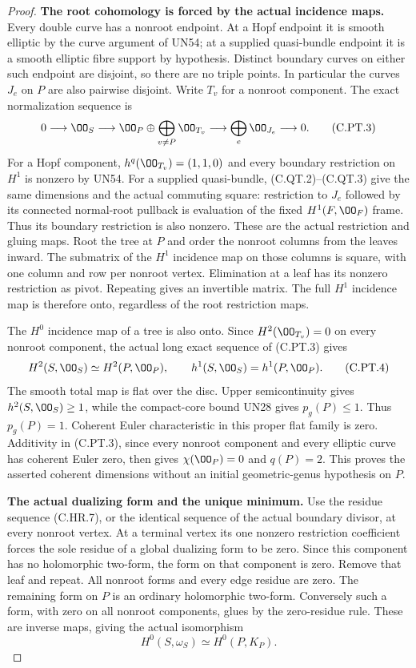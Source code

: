 \begin{proof}
\par\medskip\noindent\textbf{The root cohomology is forced by the actual incidence maps.}
Every double curve has a nonroot endpoint. At a Hopf
endpoint it is smooth elliptic by the curve argument of
UN54; at a supplied quasi-bundle endpoint it is a smooth
elliptic fibre support by hypothesis. Distinct boundary
curves on either such endpoint are disjoint, so there
are no triple points. In particular the curves $J_e$
on $P$ are also pairwise disjoint. Write $T_v$ for a
nonroot component. The exact normalization sequence is
\[
 0\longrightarrow\OO_S
 \longrightarrow\OO_P\oplus\bigoplus_{v\ne P}\OO_{T_v}
 \longrightarrow\bigoplus_e\OO_{J_e}\longrightarrow0.
 \tag{C.PT.3}
\]
For a Hopf component, $h^q(\OO_{T_v})=(1,1,0)$ and
every boundary restriction on $H^1$ is nonzero by UN54.
For a supplied quasi-bundle, (C.QT.2)--(C.QT.3) give
the same dimensions and the actual commuting square:
restriction to $J_e$ followed by its connected normal-root
pullback is evaluation of the fixed $H^1(F,\OO_F)$
frame. Thus its boundary restriction is also nonzero.
These are the actual restriction and gluing maps.
Root the tree at $P$ and order the nonroot columns from the
leaves inward. The submatrix of the $H^1$ incidence map
on those columns is square, with one column and row per
nonroot vertex. Elimination at a leaf has its nonzero
restriction as pivot. Repeating gives an invertible
matrix. The full $H^1$ incidence map is therefore onto,
regardless of the root restriction maps.

The $H^0$ incidence map of a tree is also onto. Since
$H^2(\OO_{T_v})=0$ on every nonroot component, the actual long exact
sequence of (C.PT.3) gives
\[
 H^2(S,\OO_S)\simeq H^2(P,\OO_P),\qquad
                 h^1(S,\OO_S)=h^1(P,\OO_P).
 \tag{C.PT.4}
\]
The smooth total map is flat over the disc. Upper
semicontinuity gives $h^2(S,\OO_S)\ge1$, while the
compact-core bound UN28 gives $p_g(P)\le1$. Thus
$p_g(P)=1$. Coherent Euler characteristic in this proper
flat family is zero. Additivity in (C.PT.3), since every
nonroot component and every elliptic curve has coherent Euler zero,
then gives $\chi(\OO_P)=0$ and $q(P)=2$. This proves
the asserted coherent dimensions without an initial
geometric-genus hypothesis on $P$.

\par\medskip\noindent\textbf{The actual dualizing form and the unique minimum.}
Use the residue sequence (C.HR.7), or the identical
sequence of the actual boundary divisor, at every
nonroot vertex. At a terminal vertex its one nonzero restriction
coefficient forces the sole residue of a global
dualizing form to be zero. Since this component has no
holomorphic two-form, the form on that component is zero.
Remove that leaf and repeat. All nonroot forms and every
edge residue are zero. The remaining form on $P$ is
an ordinary holomorphic two-form. Conversely such a form,
with zero on all nonroot components, glues by the zero-residue
rule. These are inverse maps, giving the actual isomorphism
\[
                  H^0(S,\omega_S)\simeq H^0(P,K_P).
 \tag{C.PT.5}
\]


\end{proof}
